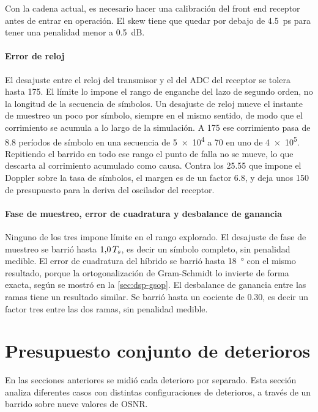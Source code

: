 Con la cadena actual, es necesario hacer una calibraci\'on del front end receptor antes de entrar en operaci\'on. El skew tiene que quedar por debajo de
\SI{4.5}{\pico\second} para tener una penalidad menor a \SI{0.5}{\dB}.


\paragraph{Error de reloj}
El desajuste entre el reloj del transmisor y el del ADC del receptor se tolera
hasta \SI{175}{\ppm}. El l\'imite lo impone el rango de enganche del lazo de
segundo orden, no la longitud de la secuencia de s\'imbolos. Un desajuste de reloj mueve el
instante de muestreo un poco por s\'imbolo, siempre en el mismo sentido, de
modo que el corrimiento se acumula a lo largo de la simulaci\'on. A
\SI{175}{\ppm} ese corrimiento pasa de \num{8.8} per\'iodos de s\'imbolo en una
secuencia de \num{5e4} a \num{70} en uno de \num{4e5}. Repitiendo el barrido en
todo ese rango el punto de falla no se mueve, lo que descarta al corrimiento
acumulado como causa. Contra los \SI{25.55}{\ppm} que impone el Doppler sobre
la tasa de s\'imbolos, el margen es de un factor \num{6.8}, y deja unos
\SI{150}{\ppm} de presupuesto para la deriva del oscilador del receptor.

\paragraph{Fase de muestreo, error de cuadratura y desbalance de ganancia}
Ninguno de los tres impone l\'imite en el rango explorado. El desajuste de fase
de muestreo se barri\'o hasta $1{,}0\,T_{s}$, es decir un s\'imbolo completo,
sin penalidad medible.
El error de cuadratura del h\'ibrido se barri\'o hasta \SI{18}{\degree} con el
mismo resultado, porque la ortogonalizaci\'on de Gram-Schmidt lo invierte de
forma exacta, seg\'un se mostr\'o en la \cref{sec:dsp-gsop}.
El desbalance de ganancia entre las ramas tiene un resultado similar. Se barri\'o
hasta un cociente de \num{0.30}, es decir un factor tres entre las dos
ramas, sin penalidad medible.


\section{Presupuesto conjunto de deterioros}
\label{sec:tol-presupuesto}

En las secciones anteriores se midi\'o cada deterioro por separado. Esta secci\'on analiza diferentes casos con distintas configuraciones de deterioros, a trav\'es de un barrido sobre nueve valores de OSNR.

